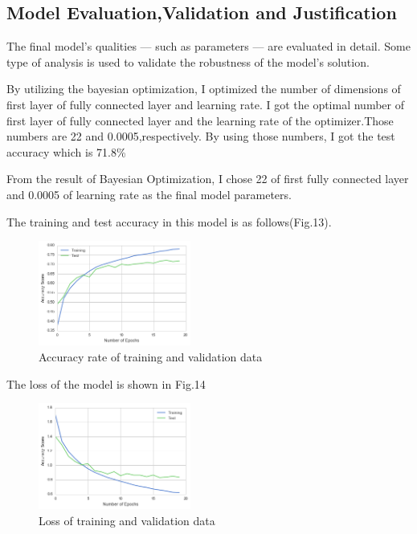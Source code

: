 \subsection{Model Evaluation,Validation and Justification}
The final model’s qualities — such as parameters — are evaluated in detail. Some type of analysis is used to validate the robustness of the model’s solution.

By utilizing the bayesian optimization, I optimized the number of dimensions of first layer of fully connected layer and learning rate. I got the optimal number of first layer of fully connected layer and the learning rate of the optimizer.Those numbers are 22 and 0.0005,respectively. By using those numbers, I got the test accuracy which is 71.8\%


From the result of Bayesian Optimization, I chose 22 of first fully connected layer and 0.0005 of learning rate as the final model parameters.


The training and test accuracy in this model is as follows(Fig.13).


\begin{figure}[H]

	\begin{center}
	\includegraphics[width=5cm]{picture/final_model_cnn.png}
	\caption{Accuracy rate of training and validation data}
	\end{center}
	\label{fig:13}

\end{figure}


The loss of the model is shown in Fig.14

 \begin{figure}[H]

	\begin{center}
	\includegraphics[width=5cm]{picture/final_model_loss.png}
	\caption{Loss of training and validation data}
	\end{center}
	\label{fig:14}

\end{figure}




